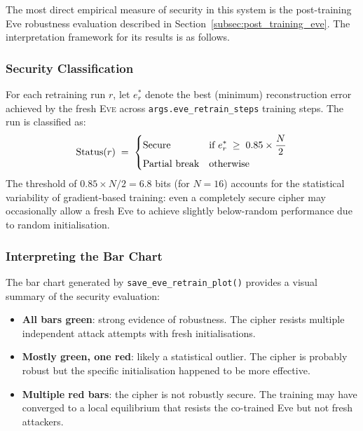 \documentclass[12pt, a4paper]{article}
\newcommand{\eve}{\textsc{Eve}}
\newcommand{\code}[1]{\texttt{\color{CodeRed}#1}}
\begin{document}
The most direct empirical measure of security in this system is the
post-training Eve robustness evaluation described in Section~\ref{subsec:post_training_eve}.
The interpretation framework for its results is as follows.

\subsubsection*{Security Classification}

For each retraining run $r$, let $e_r^*$ denote the best (minimum)
reconstruction error achieved by the fresh \eve{} across
\code{args.eve\_retrain\_steps} training steps. The run is
classified as:
%
\begin{equation}
  \text{Status}(r) \;=\;
  \begin{dcases}
    \text{Secure}        & \text{if } e_r^* \;\geq\; 0.85 \times \frac{N}{2} \\
    \text{Partial break} & \text{otherwise}
  \end{dcases}
  \label{eq:security_classification}
\end{equation}
%
The threshold of $0.85 \times N/2 = 6.8$ bits (for $N=16$) accounts
for the statistical variability of gradient-based training: even a
completely secure cipher may occasionally allow a fresh Eve to achieve
slightly below-random performance due to random initialisation.

\subsubsection*{Interpreting the Bar Chart}

The bar chart generated by \code{save\_eve\_retrain\_plot()} provides
a visual summary of the security evaluation:

\begin{itemize}[leftmargin=1.8em, itemsep=4pt]
  \item \textbf{All bars green}: strong evidence of robustness. The
        cipher resists multiple independent attack attempts with
        fresh initialisations.
  \item \textbf{Mostly green, one red}: likely a statistical outlier.
        The cipher is probably robust but the specific initialisation
        happened to be more effective.
  \item \textbf{Multiple red bars}: the cipher is not robustly secure.
        The training may have converged to a local equilibrium that
        resists the co-trained Eve but not fresh attackers.
\end{itemize}
\end{document}
